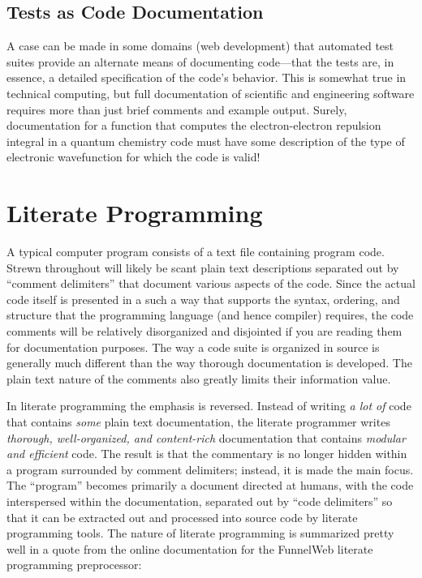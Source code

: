 \subsection{Tests as Code Documentation}
A case can be made in some domains (\eg web development) that automated test suites 
provide an alternate means of documenting code---that
the tests are, in essence, a detailed specification of the code's behavior. This is somewhat true in
technical computing, but full documentation of scientific and engineering software requires 
more than just brief comments and example output. Surely, documentation for a function that computes 
the electron-electron repulsion integral in a quantum chemistry code must have some description
of the type of electronic wavefunction for which the code is valid! 

\section{Literate Programming}

A typical computer program consists of a text file 
containing program code. Strewn throughout will likely be scant plain text descriptions separated out by 
``comment delimiters'' that document various aspects of the code.
Since the actual code itself is presented in a such a way that supports the syntax, ordering, and structure 
that the programming language (and hence compiler) requires, the code comments will
be relatively disorganized and disjointed if you are reading them for documentation purposes. 
The way a code suite is organized in source is generally much different than the way thorough documentation is 
developed. The plain text nature of the comments also greatly limits their information value.

In literate programming the emphasis is reversed. Instead of writing \textit{a lot of} code that contains 
\textit{some} plain text documentation, 
the literate programmer writes \textit{thorough, well-organized, and content-rich} documentation that contains 
\textit{modular and efficient} code. 
The result is that the commentary is no longer hidden within a program surrounded by 
comment delimiters; instead, it is made the main focus. 
The ``program'' becomes primarily a document directed at humans, with the 
code interspersed within the documentation, separated out by ``code delimiters'' so that it can be extracted 
out and processed into source code by literate programming tools. The nature of literate programming is 
summarized pretty well in a quote from the online documentation for the FunnelWeb literate programming
preprocessor:

